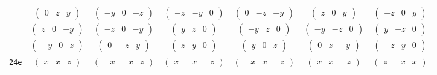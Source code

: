\documentclass[fleqn,9pt,landscape]{jsarticle}
\begin{document}
\begin{center}
\begin{longtable}{ccccccc}
& $ \begin{pmatrix} 0 & z & y \end{pmatrix} $ & $ \begin{pmatrix} - y & 0 & - z \end{pmatrix} $ & $ \begin{pmatrix} - z & - y & 0 \end{pmatrix} $ & $ \begin{pmatrix} 0 & - z & - y \end{pmatrix} $ & $ \begin{pmatrix} z & 0 & y \end{pmatrix} $ & $ \begin{pmatrix} - z & 0 & y \end{pmatrix} $ \\
& $ \begin{pmatrix} z & 0 & - y \end{pmatrix} $ & $ \begin{pmatrix} - z & 0 & - y \end{pmatrix} $ & $ \begin{pmatrix} y & z & 0 \end{pmatrix} $ & $ \begin{pmatrix} - y & z & 0 \end{pmatrix} $ & $ \begin{pmatrix} - y & - z & 0 \end{pmatrix} $ & $ \begin{pmatrix} y & - z & 0 \end{pmatrix} $ \\
& $ \begin{pmatrix} - y & 0 & z \end{pmatrix} $ & $ \begin{pmatrix} 0 & - z & y \end{pmatrix} $ & $ \begin{pmatrix} z & y & 0 \end{pmatrix} $ & $ \begin{pmatrix} y & 0 & z \end{pmatrix} $ & $ \begin{pmatrix} 0 & z & - y \end{pmatrix} $ & $ \begin{pmatrix} - z & y & 0 \end{pmatrix} $ \\ \hline
{\tt 24e} & $ \begin{pmatrix} x & x & z \end{pmatrix} $ & $ \begin{pmatrix} - x & - x & z \end{pmatrix} $ & $ \begin{pmatrix} x & - x & - z \end{pmatrix} $ & $ \begin{pmatrix} - x & x & - z \end{pmatrix} $ & $ \begin{pmatrix} x & x & - z \end{pmatrix} $ & $ \begin{pmatrix} z & - x & x \end{pmatrix} $ \\

\end{longtable}
\end{center}
\end{document}
